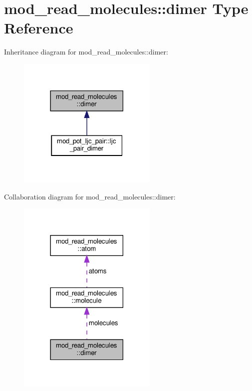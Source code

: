 \hypertarget{structmod__read__molecules_1_1dimer}{}\section{mod\+\_\+read\+\_\+molecules\+:\+:dimer Type Reference}
\label{structmod__read__molecules_1_1dimer}


Inheritance diagram for mod\+\_\+read\+\_\+molecules\+:\+:dimer\+:
\nopagebreak
\begin{figure}[H]
\begin{center}
\leavevmode
\includegraphics[width=189pt]{structmod__read__molecules_1_1dimer__inherit__graph}
\end{center}
\end{figure}


Collaboration diagram for mod\+\_\+read\+\_\+molecules\+:\+:dimer\+:
\nopagebreak
\begin{figure}[H]
\begin{center}
\leavevmode
\includegraphics[width=189pt]{structmod__read__molecules_1_1dimer__coll__graph}
\end{center}
\end{figure}
